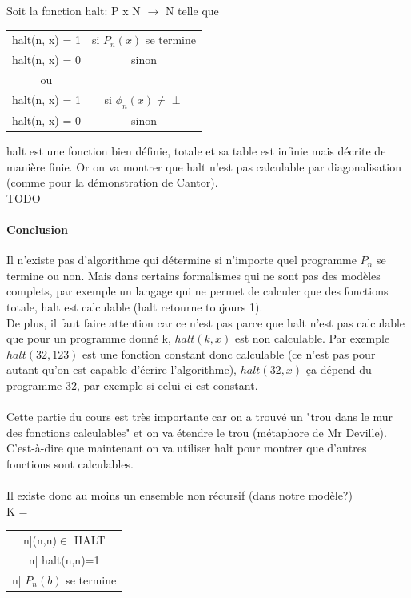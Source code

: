 \documentclass[11pt,a4paper]{article}
\begin{document}
Soit la fonction halt: P x N $\rightarrow$ N telle que \\
\begin{tabular}{cc}
  halt(n, x) = 1 & si $P_n(x)$ se termine \\
  halt(n, x) = 0 & sinon \\
  ou &\\
  halt(n, x) = 1 & si $\phi_n(x)\neq \perp$ \\
  halt(n, x) = 0 & sinon \\
\end{tabular}

halt est une fonction bien définie, totale et sa table est infinie mais décrite 
de manière finie. Or on va montrer que halt n'est pas calculable par 
diagonalisation (comme pour la démonstration de Cantor).\\

TODO \\

\paragraph{Conclusion} Il n'existe pas d'algorithme qui détermine si n'importe 
quel programme $P_n$ se termine ou non. Mais dans certains formalismes qui ne 
sont pas des modèles complets, par exemple un langage qui ne permet de calculer 
que des fonctions totale, halt est calculable (halt retourne toujours 1). \\
De plus, il faut faire attention car ce n'est pas parce que halt n'est pas 
calculable que pour un programme donné k, $halt(k,x)$ est non calculable. Par 
exemple $halt(32,123)$ est une fonction constant donc calculable (ce n'est pas 
pour autant qu'on est capable d'écrire l'algorithme), $halt(32,x)$ ça dépend du 
programme 32, par exemple si celui-ci est constant.

\paragraph{} Cette partie du cours est très importante car on a trouvé un 
"trou dans le mur des fonctions calculables" et on va étendre le trou (métaphore
de Mr Deville). C'est-à-dire que maintenant on va utiliser halt pour montrer 
que d'autres fonctions sont calculables.

\paragraph{} Il existe donc au moins un ensemble non récursif (dans notre 
modèle?)\\
K = 
\begin{tabular}{c}
{n|(n,n)$\in$ HALT}\\
{n| halt(n,n)=1}\\
{n| $P_n(b)$ se termine} \\
\end{tabular}
\end{document}

